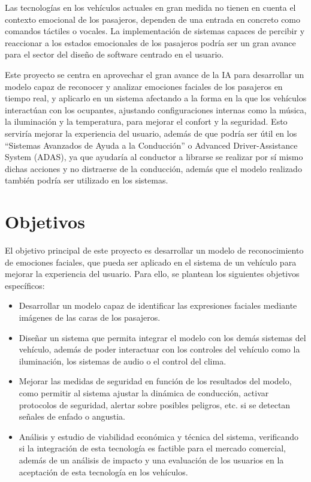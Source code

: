 \documentclass[12pt]{report} %
\begin{document}
Las tecnologías en los vehículos actuales en gran medida no tienen en cuenta el contexto emocional de los pasajeros, dependen de una entrada en concreto como comandos táctiles o vocales. La implementación de sistemas capaces de percibir y reaccionar a los estados emocionales de los pasajeros podría ser un gran avance para el sector del diseño de software centrado en el usuario.

Este proyecto se centra en aprovechar el gran avance de la IA para desarrollar un modelo capaz de reconocer y analizar emociones faciales de los pasajeros en tiempo real, y aplicarlo en un sistema afectando a la forma en la que los vehículos interactúan con los ocupantes, ajustando configuraciones internas como la música, la iluminación y la temperatura, para mejorar el confort y la seguridad. Esto serviría mejorar la experiencia del usuario, además de que podría ser útil en los “Sistemas Avanzados de Ayuda a la Conducción” o Advanced Driver-Assistance System (ADAS), ya que ayudaría al conductor a librarse se realizar por sí mismo dichas acciones y no distraerse de la conducción, además que el modelo realizado también podría ser utilizado en los sistemas. 

\section{Objetivos}

El objetivo principal de este proyecto es desarrollar un modelo de reconocimiento de emociones faciales, que pueda ser aplicado en el sistema de un vehículo para mejorar la experiencia del usuario. Para ello, se plantean los siguientes objetivos específicos:

\begin{itemize}

	\item Desarrollar un modelo capaz de identificar las expresiones faciales mediante imágenes de las caras de los pasajeros.
    \item Diseñar un sistema que permita integrar el modelo con los demás sistemas del vehículo, además de poder interactuar con los controles del vehículo como la iluminación, los sistemas de audio o el control del clima.
    \item Mejorar las medidas de seguridad en función de los resultados del modelo, como permitir al sistema ajustar la dinámica de conducción, activar protocolos de seguridad, alertar sobre posibles peligros, etc. si se detectan señales de enfado o angustia. 
    \item Análisis y estudio de viabilidad económica y técnica del sistema, verificando si la integración de esta tecnología es factible para el mercado comercial, además de un análisis de impacto y una evaluación de los usuarios en la aceptación de esta tecnología en los vehículos.

\end{itemize}
\end{document}
